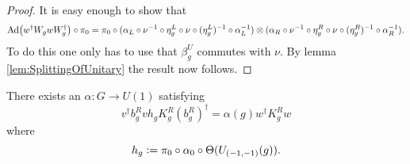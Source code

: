 \documentclass[11pt,a4paper,twoside]{article}
\numberwithin{equation}{section}
\begin{document}
\begin{proof}
	It is easy enough to show that
	\begin{equation}
		\Ad{w^\dagger W_g w W_g^\dagger}\circ\pi_0=\pi_0\circ (\alpha_L\circ\nu^{-1}\circ\eta_g^L\circ\nu\circ(\eta_g^L)^{-1}\circ\alpha_L^{-1})\otimes(\alpha_R\circ\nu^{-1}\circ\eta_g^R\circ\nu\circ(\eta_g^R)^{-1}\circ\alpha_R^{-1}).
	\end{equation}
	To do this one only has to use that $\beta_g^U$ commutes with $\nu$. By lemma \ref{lem:SplittingOfUnitary} the result now follows.
\end{proof}
\begin{lemma}\label{lem:DefinitionAlpha}
	There exists an $\alpha:G\rightarrow U(1)$ satisfying
	\begin{equation}\label{eq:DefinitionOfTheH_1Index}
		v^\dagger b_g^R vh_g K_g^R (b_g^R)^\dagger=\alpha(g)w^\dagger K_g^R w
	\end{equation}
	where
	\begin{equation}
		h_g\vcentcolon=\pi_0\circ\alpha_0\circ\Theta(U_{(-1,-1)}(g)).
	\end{equation}
\end{lemma}
\end{document}
